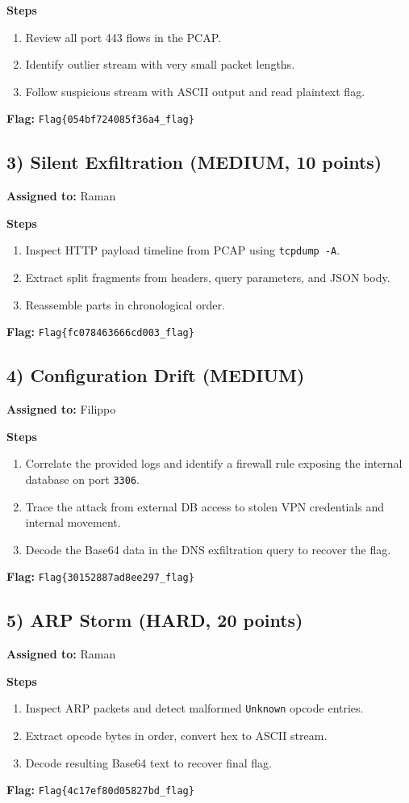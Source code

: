 \documentclass[10pt,a4paper]{article}
\begin{document}
\textbf{Steps}
\begin{enumerate}[leftmargin=*,noitemsep]
  \item Review all port 443 flows in the PCAP.
  \item Identify outlier stream with very small packet lengths.
  \item Follow suspicious stream with ASCII output and read plaintext flag.
\end{enumerate}

\textbf{Flag:} \texttt{Flag\{054bf724085f36a4\_flag\}}

\subsection*{3) Silent Exfiltration (MEDIUM, 10 points)}
\textbf{Assigned to:} Raman

\textbf{Steps}
\begin{enumerate}[leftmargin=*,noitemsep]
  \item Inspect HTTP payload timeline from PCAP using \texttt{tcpdump -A}.
  \item Extract split fragments from headers, query parameters, and JSON body.
  \item Reassemble parts in chronological order.
\end{enumerate}

\textbf{Flag:} \texttt{Flag\{fc078463666cd003\_flag\}}

\subsection*{4) Configuration Drift (MEDIUM)}
\textbf{Assigned to:} Filippo

\textbf{Steps}
\begin{enumerate}[leftmargin=*,noitemsep]
  \item Correlate the provided logs and identify a firewall rule exposing the internal database on port \texttt{3306}.
  \item Trace the attack from external DB access to stolen VPN credentials and internal movement.
  \item Decode the Base64 data in the DNS exfiltration query to recover the flag.
\end{enumerate}

\textbf{Flag:} \texttt{Flag\{30152887ad8ee297\_flag\}}


\subsection*{5) ARP Storm (HARD, 20 points)}
\textbf{Assigned to:} Raman

\textbf{Steps}
\begin{enumerate}[leftmargin=*,noitemsep]
  \item Inspect ARP packets and detect malformed \texttt{Unknown} opcode entries.
  \item Extract opcode bytes in order, convert hex to ASCII stream.
  \item Decode resulting Base64 text to recover final flag.
\end{enumerate}

\textbf{Flag:} \texttt{Flag\{4c17ef80d05827bd\_flag\}}
\end{document}
